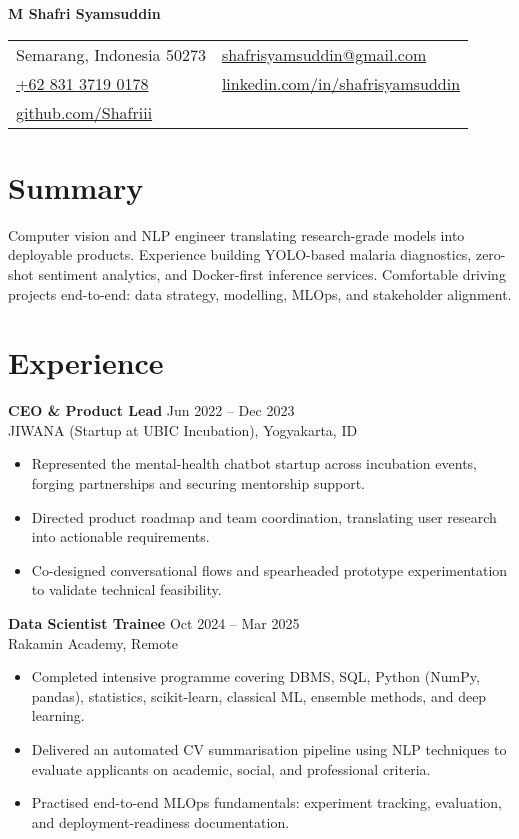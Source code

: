 \documentclass[11pt,a4paper]{article}
\begin{document}
{\huge \textbf{M Shafri Syamsuddin}}\\[2pt]
\begin{tabularx}{\textwidth}{@{}X X@{}}
Semarang, Indonesia 50273 & \href{mailto:shafrisyamsuddin@gmail.com}{shafrisyamsuddin@gmail.com}\\
\href{tel:+6283137190178}{+62 831 3719 0178} & \href{https://www.linkedin.com/in/shafrisyamsuddin/}{linkedin.com/in/shafrisyamsuddin} \\
\href{https://github.com/Shafriii}{github.com/Shafriii} &
\end{tabularx}

\section*{Summary}
Computer vision and NLP engineer translating research-grade models into deployable products. Experience building YOLO-based malaria diagnostics, zero-shot sentiment analytics, and Docker-first inference services. Comfortable driving projects end-to-end: data strategy, modelling, MLOps, and stakeholder alignment.

\section*{Experience}
\textbf{CEO \& Product Lead} \hfill Jun 2022 -- Dec 2023\\
JIWANA (Startup at UBIC Incubation), Yogyakarta, ID
\begin{itemize}
  \item Represented the mental-health chatbot startup across incubation events, forging partnerships and securing mentorship support.
  \item Directed product roadmap and team coordination, translating user research into actionable requirements.
  \item Co-designed conversational flows and spearheaded prototype experimentation to validate technical feasibility.
\end{itemize}

\textbf{Data Scientist Trainee} \hfill Oct 2024 -- Mar 2025\\
Rakamin Academy, Remote
\begin{itemize}
  \item Completed intensive programme covering DBMS, SQL, Python (NumPy, pandas), statistics, scikit-learn, classical ML, ensemble methods, and deep learning.
  \item Delivered an automated CV summarisation pipeline using NLP techniques to evaluate applicants on academic, social, and professional criteria.
  \item Practised end-to-end MLOps fundamentals: experiment tracking, evaluation, and deployment-readiness documentation.
\end{itemize}
\end{document}
